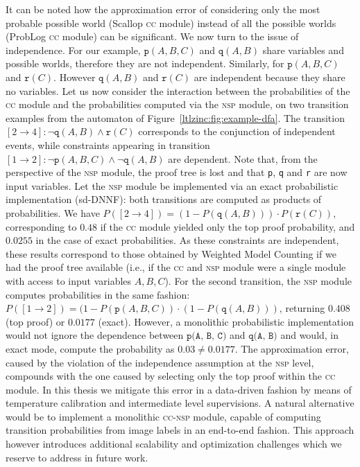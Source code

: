 It can be noted how the approximation error of considering only the most probable possible
world (Scallop \textsc{cc} module) instead of all the possible worlds (ProbLog \textsc{cc} module) can be significant.
%
We now turn to the issue of independence. For our example, $\texttt{p}(A,B,C)$ and $\texttt{q}(A, B)$ share variables and possible worlds, therefore they are not independent. Similarly, for $\texttt{p}(A, B, C)$ and $\texttt{r}(C)$. However 
$\texttt{q}(A, B)$ and $\texttt{r}(C)$ are independent because they share no variables.
Let us now consider the interaction between the probabilities of the \textsc{cc} module and the probabilities computed via the \textsc{nsp} module, on two transition examples from the automaton of Figure~\ref{ltlzinc:fig:example-dfa}. The transition $[2\rightarrow4]: \neg \texttt{q}(A, B) \wedge \texttt{r}(C)$ corresponds to the conjunction of independent events, while constraints appearing in transition $[1\rightarrow2]: \neg \texttt{p}(A,B,C) \wedge \neg \texttt{q}(A, B)$ are dependent. Note that, from the perspective of the \textsc{nsp} module, the proof tree is lost and that \texttt{p}, \texttt{q} and \texttt{r} are now input variables.
Let the \textsc{nsp} module be implemented via an exact probabilistic implementation (sd-DNNF): both transitions are computed as products of probabilities.
We have $P([2\rightarrow4]) = (1 - P(\texttt{q}(A, B))) \cdot P(\texttt{r}(C))$, corresponding to $0.48$ if the \textsc{cc} module yielded only the top proof probability, and $0.0255$ in the case of exact probabilities. As these constraints are independent, these results correspond to those obtained by Weighted Model Counting if we had the proof tree available (i.e., if the \textsc{cc} and \textsc{nsp} module were a single module with access to input variables $A, B, C$).
For the second transition, the \textsc{nsp} module computes probabilities in the same fashion: $P([1 \rightarrow 2]) = (1 - P(\texttt{p}(A, B, C)) \cdot (1 - P(\texttt{q}(A, B)))$, returning $0.408$ (top proof) or $0.0177$ (exact). However, a monolithic probabilistic implementation would not ignore the
dependence between $\texttt{p(A, B, C)}$ and $\texttt{q(A, B)}$ and would, in exact mode, compute the probability as $0.03 \neq 0.0177$.
%
The approximation error, caused by the violation of the independence assumption at the \textsc{nsp} level, compounds with the one caused by selecting only the top proof within the \textsc{cc} module. In this thesis we mitigate this error in a data-driven fashion by means of temperature calibration and intermediate level supervisions.
A natural alternative would be to implement a monolithic \textsc{cc-nsp} module, capable of computing transition probabilities from image labels in an end-to-end fashion. This approach however introduces additional scalability and optimization challenges which we reserve to address in future work.



